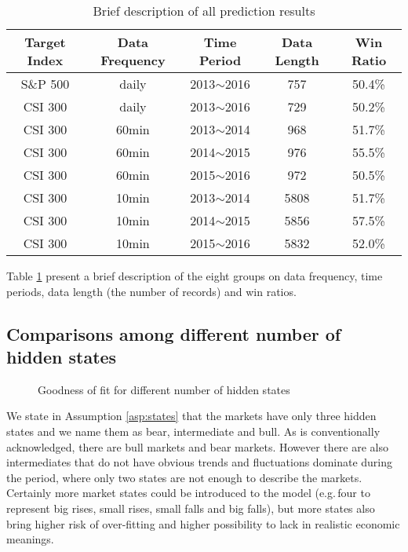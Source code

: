         \begin{table}[!hbt]
        \center
        \caption{Brief description of all prediction results}
        \label{table:results}
        \begin{tabular}{c c c c c}
        \hline
        Target Index  &  Data Frequency  &  Time Period  &  Data Length  &  Win Ratio  \\
        \hline
        S\&P 500  &  daily  &  2013$\sim$2016  &  757  &  50.4\%  \\
        CSI 300   &  daily  &  2013$\sim$2016  &  729  &  50.2\%  \\
        CSI 300   &  60min  &  2013$\sim$2014  &  968  &  51.7\%  \\
        CSI 300   &  60min  &  2014$\sim$2015  &  976  &  55.5\%  \\
        CSI 300   &  60min  &  2015$\sim$2016  &  972  &  50.5\%  \\
        CSI 300   &  10min  &  2013$\sim$2014  &  5808  &  51.7\%  \\
        CSI 300   &  10min  &  2014$\sim$2015  &  5856  &  57.5\%  \\
        CSI 300   &  10min  &  2015$\sim$2016  &  5832  &  52.0\%  \\
        \hline
        \end{tabular}
        \end{table}
Table \ref{table:results} present a brief description of the eight groups 
on data frequency, time periods, data length (the number of records) and win ratios.

\subsection{Comparisons among different number of hidden states}
\label{sec:positive:result:states}
        \begin{figure}[!hbt]
        \begin{center}
        \end{center}
        \caption{Goodness of fit for different number of hidden states}
        \label{fig:result:states}
        \end{figure}
We state in Assumption \ref{asp:states} that the markets have only three hidden states
and we name them as bear, intermediate and bull.
As is conventionally acknowledged, there are bull markets and bear markets.
However there are also intermediates that do not have obvious trends 
and fluctuations dominate during the period,
where only two states are not enough to describe the markets.
Certainly more market states could be introduced to the model 
(e.g.\,four to represent big rises, small rises, small falls and big falls),
but more states also bring higher risk of over-fitting and 
higher possibility to lack in realistic economic meanings.

